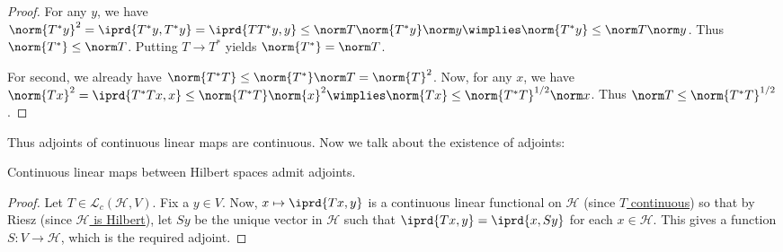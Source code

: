 	\begin{proof}
		For any $y$, we have $\norm{T^*y}^2 = \iprd{T^*y, T^*y} = \iprd{TT^*y, y}\le \norm T\norm{T^*y}\norm y\wimplies \norm{T^*y}\le \norm T\norm y$. Thus $\norm{T^*}\le\norm T$. Putting $T\to T^*$ yields $\norm{T^*} = \norm T$.
		
		For second, we already have $\norm{T^*T}\le\norm{T^*}\norm T = \norm{T}^2$. Now, for any $x$, we have $\norm{Tx}^2 = \iprd{T^*Tx, x}\le \norm{T^*T}\norm{x}^2\wimplies\norm{Tx}\le \norm{T^*T}^{1/2}\norm x$.
		Thus $\norm T\le\norm{T^*T}^{1/2}$.
	\end{proof}
	
	Thus adjoints of continuous linear maps are continuous. Now we talk about the existence of adjoints:
	
	\begin{thm}
		Continuous linear maps between Hilbert spaces admit adjoints.
	\end{thm}
	
	\begin{proof}
		Let $T\in\mathcal L_c(\mathscr H, V)$. Fix a $y\in V$. Now, $x\mapsto \iprd{Tx, y}$ is a continuous linear functional on $\mathscr H$ (since \uline{$T$ continuous}) so that by Riesz (since \uline{$\mathscr H$ is Hilbert}), let $Sy$ be the unique vector in $\mathscr H$ such that $\iprd{Tx, y} = \iprd{x, Sy}$ for each $x\in\mathscr H$. This gives a function $S\colon V\to \mathscr{H}$, which is the required adjoint.
	\end{proof}